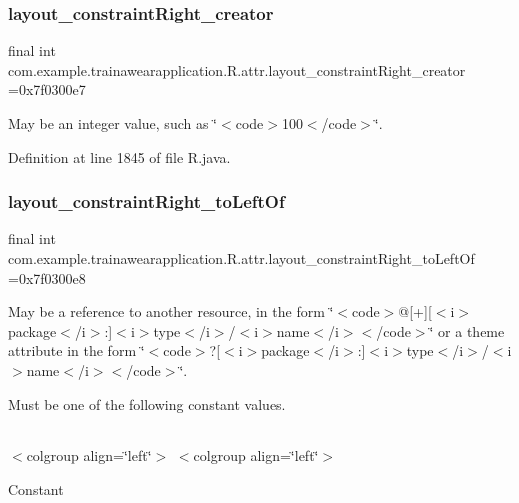 \subsubsection{\texorpdfstring{layout\_constraintRight\_creator}{layout\_constraintRight\_creator}}
{\footnotesize\ttfamily final int com.\+example.\+trainawearapplication.\+R.\+attr.\+layout\+\_\+constraint\+Right\+\_\+creator =0x7f0300e7\hspace{0.3cm}{\ttfamily [static]}}

May be an integer value, such as \char`\"{}$<$code$>$100$<$/code$>$\char`\"{}. 

Definition at line 1845 of file R.\+java.

\mbox{\label{classcom_1_1example_1_1trainawearapplication_1_1_r_1_1attr_a3b2b4e608a7c3d7c8ed4a5d034b5b91f}} 
\subsubsection{\texorpdfstring{layout\_constraintRight\_toLeftOf}{layout\_constraintRight\_toLeftOf}}
{\footnotesize\ttfamily final int com.\+example.\+trainawearapplication.\+R.\+attr.\+layout\+\_\+constraint\+Right\+\_\+to\+Left\+Of =0x7f0300e8\hspace{0.3cm}{\ttfamily [static]}}

May be a reference to another resource, in the form \char`\"{}$<$code$>$@\mbox{[}+\mbox{]}\mbox{[}$<$i$>$package$<$/i$>$\+:\mbox{]}$<$i$>$type$<$/i$>$/$<$i$>$name$<$/i$>$$<$/code$>$\char`\"{} or a theme attribute in the form \char`\"{}$<$code$>$?\mbox{[}$<$i$>$package$<$/i$>$\+:\mbox{]}$<$i$>$type$<$/i$>$/$<$i$>$name$<$/i$>$$<$/code$>$\char`\"{}. 

Must be one of the following constant values.

\tabulinesep=1mm
\begin{longtabu}spread 0pt [c]{*{0}{|X[-1]}|}
\hline
\end{longtabu}
$<$colgroup align=\char`\"{}left\char`\"{}$>$ $<$colgroup align=\char`\"{}left\char`\"{}$>$ 

Constant

